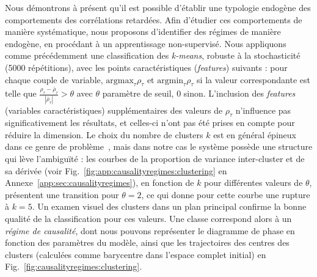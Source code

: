 {Nous démontrons à présent qu'il est possible d'établir une typologie endogène des comportements des corrélations retardées. Afin d'étudier ces comportements de manière systématique, nous proposons d'identifier des régimes de manière endogène, en procédant à un apprentissage non-supervisé. Nous appliquons comme précédemment une classification des \emph{k-means}, robuste à la stochasticité (5000 répétitions), avec les points caractéristiques (\emph{features}) suivants : pour chaque couple de variable, $\textrm{argmax}_{\tau} \rho_{\tau}$ et $\textrm{argmin}_{\tau} \rho_{\tau}$ si la valeur correspondante est telle que $\frac{\rho_{\tau}-\bar{\rho}_{\tau}}{\left|\bar{\rho}_{\tau}\right|} > \theta$ avec $\theta$ paramètre de seuil, 0 sinon. L'inclusion des \emph{features} (variables caractéristiques) supplémentaires des valeurs de $\rho_{\tau}$ n'influence pas significativement les résultats, et celles-ci n'ont pas été prises en compte pour réduire la dimension. Le choix du nombre de clusters $k$ est en général épineux dans ce genre de problème~\cite{hamerly2003learning}, mais dans notre cas le système possède une structure qui lève l'ambiguïté : les courbes de la proportion de variance inter-cluster et de sa dérivée (voir  Fig.~\ref{fig:app:causalityregimes:clustering} en Annexe~\ref{app:sec:causalityregimes}), en fonction de $k$ pour différentes valeurs de $\theta$, présentent une transition pour $\theta = 2$, ce qui donne pour cette courbe une rupture à $k=5$. Un examen visuel des clusters dans un plan principal confirme la bonne qualité de la classification pour ces valeurs. Une classe correspond alors à un \emph{régime de causalité}, dont nous pouvons représenter le diagramme de phase en fonction des paramètres du modèle, ainsi que les trajectoires des centres des clusters (calculées comme barycentre dans l'espace complet initial) en Fig.~\ref{fig:causalityregimes:clustering}.
}




